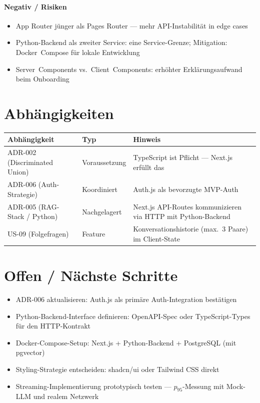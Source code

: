 \documentclass[a4paper, 11pt, oneside]{report}
\newcommand{\todo}{$\square$\;}
\begin{document}
\paragraph{Negativ / Risiken}
\begin{itemize}
  \item App Router jünger als Pages Router --- mehr API-Instabilität in edge cases
  \item Python-Backend als zweiter Service: eine Service-Grenze; Mitigation:
        Docker~Compose für lokale Entwicklung
  \item Server~Components vs.\ Client~Components: erhöhter Erklärungsaufwand
        beim Onboarding
\end{itemize}

\section{Abhängigkeiten}

\begin{table}[htb]
\small\centering
\begin{tabularx}{\linewidth}{L{4cm} L{3cm} X}
\toprule
{}
\textbf{Abhängigkeit} & \textbf{Typ} & \textbf{Hinweis} \\
\midrule
ADR-002 (Discriminated Union) & Voraussetzung & TypeScript ist Pflicht --- Next.js erfüllt das \\
ADR-006 (Auth-Strategie)      & Koordiniert   & Auth.js als bevorzugte MVP-Auth \\
ADR-005 (RAG-Stack / Python)  & Nachgelagert  & Next.js API-Routes kommunizieren via HTTP mit Python-Backend \\
US-09 (Folgefragen)           & Feature       & Konversationshistorie (max.\ 3 Paare) im Client-State \\
\bottomrule
\end{tabularx}
\end{table}

\section{Offen / Nächste Schritte}

\begin{itemize}[label=\todo]
  \item ADR-006 aktualisieren: Auth.js als primäre Auth-Integration bestätigen
  \item Python-Backend-Interface definieren: OpenAPI-Spec oder TypeScript-Types
        für den HTTP-Kontrakt
  \item Docker-Compose-Setup: Next.js + Python-Backend + PostgreSQL (mit pgvector)
  \item Styling-Strategie entscheiden: shadcn/ui oder Tailwind CSS direkt
  \item Streaming-Implementierung prototypisch testen ---
        $p_{95}$-Messung mit Mock-LLM und realem Netzwerk
\end{itemize}

\end{document}
